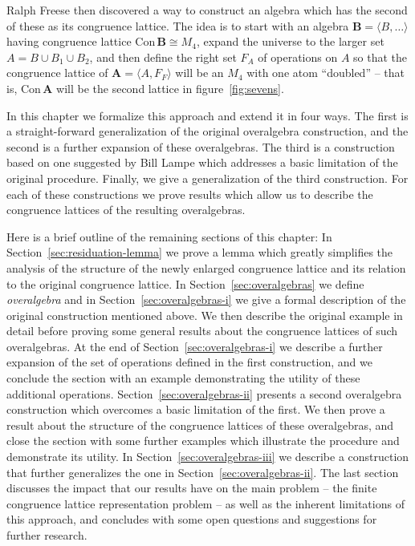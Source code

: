 \documentclass[cm,dissertation,actual,final]{uhthesis}
\theoremstyle{plain}
\theoremstyle{definition}
\theoremstyle{remark}
\numberwithin{theorem}{section}
\numberwithin{claim}{chapter}
\numberwithin{equation}{section}
\numberwithin{conjecture}{chapter}
\newcommand{\<}{\ensuremath{\langle}}
\renewcommand{\>}{\ensuremath{\rangle}}
\newcommand{\Con}{\ensuremath{\mathrm{Con\,}}}
\newcommand{\0}{\ensuremath{\mathbf{0}}}
\newcommand{\1}{\ensuremath{\mathbf{1}}}
\newcommand{\2}{\ensuremath{\mathbf{2}}}
\newcommand{\3}{\ensuremath{\mathbf{3}}}
\newcommand{\4}{\ensuremath{\mathbf{4}}}
\newcommand{\5}{\ensuremath{\mathbf{5}}}
\newcommand{\bA}{\ensuremath{\mathbf{A}}}
\newcommand{\bB}{\ensuremath{\mathbf{B}}}
\begin{document}
%
\noindent Ralph Freese then discovered a way to construct an algebra 
which has the second of these as its congruence lattice. The idea 
is to start with an algebra $\bB = \<B, \dots\>$ having congruence lattice $\Con \bB
\cong M_4$, expand the universe to the larger set $A = B\cup B_1 \cup B_2$, and
then define the right set $F_A$ of operations on $A$ so that the congruence lattice
of $\bA = \< A, F_F\>$ will be an $M_4$ with one atom ``doubled'' -- that is,
$\Con\bA$ will be the second lattice in figure~\ref{fig:sevens}.

In this chapter we formalize this approach and extend it in four ways.  The first
is a straight-forward generalization of the original overalgebra construction,
and the second is a further expansion of these overalgebras.
The third is a construction based on one suggested by 
%
Bill Lampe which addresses a basic
limitation of the original procedure.  Finally, we give a generalization of the third
construction.  For each of these constructions we prove
results which allow us to describe the congruence lattices of the resulting
overalgebras. 

Here is a brief outline of the remaining sections of this chapter:
In Section~\ref{sec:residuation-lemma} we prove a lemma which greatly simplifies the
analysis of the structure of the newly enlarged congruence lattice and
its relation to the original congruence lattice.
In Section~\ref{sec:overalgebras} we define {\it overalgebra} and in 
Section~\ref{sec:overalgebras-i} we give a formal description of
the original construction mentioned above.  We then describe the
original example in detail before proving some general results about
the congruence lattices of such overalgebras.
At the end of Section~\ref{sec:overalgebras-i} we describe a further expansion
of the set of operations defined in the first construction, and we conclude the
section with an example demonstrating the utility of these additional operations.
Section~\ref{sec:overalgebras-ii}
presents a second overalgebra construction which overcomes a basic limitation 
of the first.  We then
prove a result about the structure of the congruence lattices of these overalgebras,
and close the section with some further examples which illustrate the procedure and
demonstrate its utility.  In Section~\ref{sec:overalgebras-iii}
we describe a construction that further generalizes the one in
Section~\ref{sec:overalgebras-ii}. 
The last section discusses the impact that our results
have on the main problem -- the finite congruence lattice representation problem
-- as well as the inherent limitations of this approach, and concludes with some
open questions and suggestions for further research.  
\end{document}
